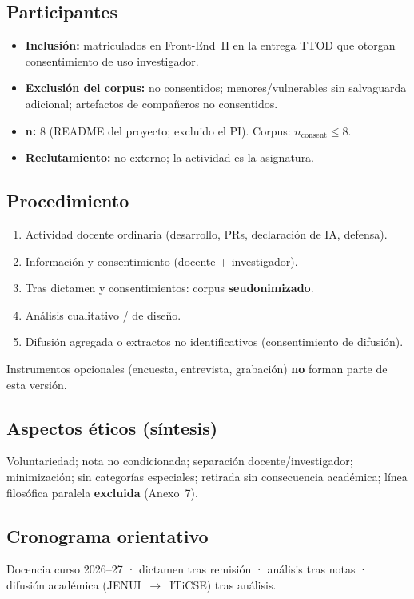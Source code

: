 \documentclass[11pt,a4paper]{scrartcl}
\begin{document}
\subsection*{Participantes}
\begin{itemize}
  \item \textbf{Inclusión:} matriculados en Front-End~II en la entrega TTOD que
        otorgan consentimiento de uso investigador.
  \item \textbf{Exclusión del corpus:} no consentidos; menores/vulnerables sin
        salvaguarda adicional; artefactos de compañeros no consentidos.
  \item \textbf{n:} 8 (README del proyecto; excluido el PI). Corpus: $n_{\mathrm{consent}}\leq 8$.
  \item \textbf{Reclutamiento:} no externo; la actividad es la asignatura.
\end{itemize}

\subsection*{Procedimiento}
\begin{enumerate}
  \item Actividad docente ordinaria (desarrollo, PRs, declaración de IA, defensa).
  \item Información y consentimiento (docente + investigador).
  \item Tras dictamen y consentimientos: corpus \textbf{seudonimizado}.
  \item Análisis cualitativo / de diseño.
  \item Difusión agregada o extractos no identificativos (consentimiento de difusión).
\end{enumerate}
Instrumentos opcionales (encuesta, entrevista, grabación) \textbf{no} forman parte
de esta versión.

\subsection*{Aspectos éticos (síntesis)}
Voluntariedad; nota no condicionada; separación docente/investigador; minimización;
sin categorías especiales; retirada sin consecuencia académica; línea filosófica
paralela \textbf{excluida} (Anexo~7).

\subsection*{Cronograma orientativo}
Docencia curso 2026--27 · dictamen tras remisión · análisis tras notas · difusión
académica (JENUI~$\rightarrow$~ITiCSE) tras análisis.
\end{document}

